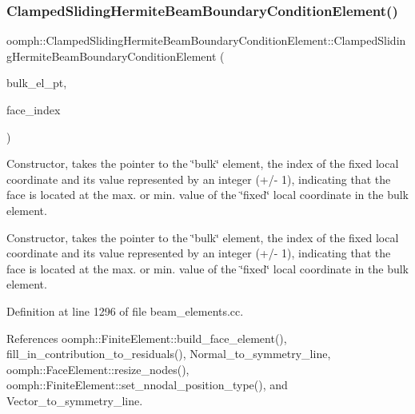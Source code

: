 \subsubsection{\texorpdfstring{Clamped\+Sliding\+Hermite\+Beam\+Boundary\+Condition\+Element()}{ClampedSlidingHermiteBeamBoundaryConditionElement()}\hspace{0.1cm}{\footnotesize\ttfamily [1/3]}}
{\footnotesize\ttfamily oomph\+::\+Clamped\+Sliding\+Hermite\+Beam\+Boundary\+Condition\+Element\+::\+Clamped\+Sliding\+Hermite\+Beam\+Boundary\+Condition\+Element (\begin{DoxyParamCaption}\item[{\hyperlink{classoomph_1_1FiniteElement}{Finite\+Element} $\ast$const \&}]{bulk\+\_\+el\+\_\+pt,  }\item[{const int \&}]{face\+\_\+index }\end{DoxyParamCaption})}



Constructor, takes the pointer to the \char`\"{}bulk\char`\"{} element, the index of the fixed local coordinate and its value represented by an integer (+/-\/ 1), indicating that the face is located at the max. or min. value of the \char`\"{}fixed\char`\"{} local coordinate in the bulk element. 

Constructor, takes the pointer to the \char`\"{}bulk\char`\"{} element, the index of the fixed local coordinate and its value represented by an integer (+/-\/ 1), indicating that the face is located at the max. or min. value of the \char`\"{}fixed\char`\"{} local coordinate in the bulk element. 

Definition at line 1296 of file beam\+\_\+elements.\+cc.



References oomph\+::\+Finite\+Element\+::build\+\_\+face\+\_\+element(), fill\+\_\+in\+\_\+contribution\+\_\+to\+\_\+residuals(), Normal\+\_\+to\+\_\+symmetry\+\_\+line, oomph\+::\+Face\+Element\+::resize\+\_\+nodes(), oomph\+::\+Finite\+Element\+::set\+\_\+nnodal\+\_\+position\+\_\+type(), and Vector\+\_\+to\+\_\+symmetry\+\_\+line.

\mbox{\label{classoomph_1_1ClampedSlidingHermiteBeamBoundaryConditionElement_ae3c06457953887a705f8308023e4f2e1}} 
